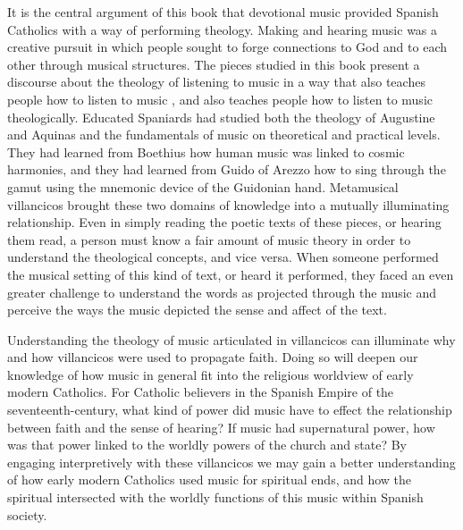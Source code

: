 It is the central argument of this book that devotional music provided Spanish
Catholics with a way of performing theology. 
Making and hearing music was a creative pursuit in which people sought to forge
connections to God and to each other through musical structures.
The pieces studied in this book present a discourse about the theology of
listening to music in a way that also teaches people how to listen to music ,
and also teaches people how to listen to music theologically.
Educated Spaniards had studied both the theology of Augustine and Aquinas and  
the fundamentals of music on theoretical and practical levels. 
They had learned from Boethius how human music was linked to cosmic harmonies,
and they had learned from Guido of Arezzo how to sing through the gamut using
the mnemonic device of the Guidonian hand.
Metamusical villancicos brought these two domains of knowledge into a mutually
illuminating relationship.
Even in simply reading the poetic texts of these pieces, or hearing them read,
a person must know a fair amount of music theory in order to understand the
theological concepts, and vice versa.
When someone performed the musical setting of this kind of text, or heard it
performed, they faced an even greater challenge to understand the words as
projected through the music and perceive the ways the music depicted the sense
and affect of the text. 

Understanding the theology of music articulated in villancicos can illuminate
why and how villancicos were used to propagate faith.  
Doing so will deepen our knowledge of how music in general fit into the
religious worldview of early modern Catholics. 
For Catholic believers in the Spanish Empire of the seventeenth-century, what
kind of power did music have to effect the relationship between faith and the
sense of hearing?
If music had supernatural power, how was that power linked to the worldly
powers of the church and state?
By engaging interpretively with these villancicos we may gain a better
understanding of how early modern Catholics used music for spiritual ends, and
how the spiritual intersected with the worldly functions of this music within
Spanish society. 

